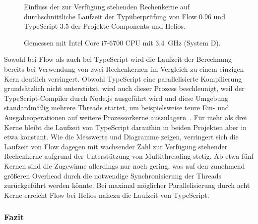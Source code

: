 \tablespace


\begin{figure}[p]
  \centering

  

  \vspace{0.5\baselineskip}

  
  \vspace{0.5\baselineskip}
  \caption[Einfluss der zur Verfügung stehenden Rechenkerne auf durchschnittliche Laufzeit der Typüberprüfung von Flow und TypeScript]{
    Einfluss der zur Verfügung stehenden Rechenkerne auf durchschnittliche Laufzeit der Typüberprüfung von Flow 0.96 und TypeScript 3.5 der Projekte Components und Helios.
  }

  \vspace{0.75\baselineskip}
  \caption*{
    \small
    Gemessen mit Intel Core i7-6700 CPU mit 3,4~GHz (System D).
  }

  \label{fig:plot-cores}
\end{figure}

Sowohl bei Flow als auch bei TypeScript wird die Laufzeit der Berechnung bereits bei Verwendung von zwei Rechenkernen im Vergleich zu einem einzigen Kern deutlich verringert. Obwohl TypeScript eine parallelisierte Kompilierung grundsätzlich nicht unterstützt, wird auch dieser Prozess beschleunigt, weil der TypeScript-Compiler durch Node.js ausgeführt wird und diese Umgebung standardmäßig mehrere Threads startet, um beispielsweise teure Ein- und Ausgabeoperationen auf weitere Prozessorkerne auszulagern~\autocite{NODE:THREADS}. Für mehr als drei Kerne bleibt die Laufzeit von TypeScript daraufhin in beiden Projekten aber in etwa konstant. Wie die Messwerte und Diagramme zeigen, verringert sich die Laufzeit von Flow dagegen mit wachsender Zahl zur Verfügung stehender Rechenkerne aufgrund der Unterstützung von Multithreading stetig. Ab etwa fünf Kernen sind die Zugewinne allerdings nur noch gering, was auf den zunehmend größeren Overhead durch die notwendige Synchronisierung der Threads zurückgeführt werden könnte. Bei maximal möglicher Parallelisierung durch acht Kerne erreicht Flow bei Helios nahezu die Laufzeit von TypeScript.

\subsubsection{Fazit}

